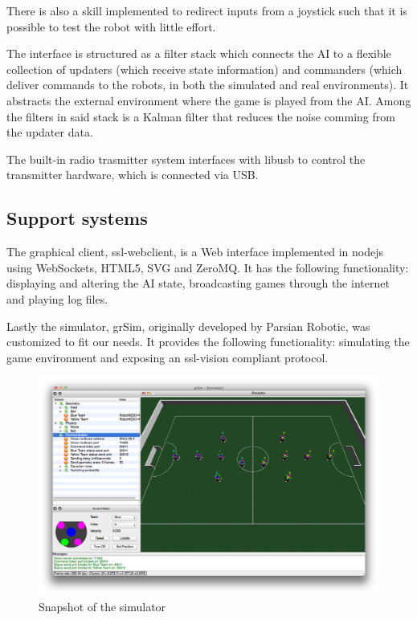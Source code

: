 There is also a skill implemented to redirect inputs from a joystick such that it is possible to test the robot with little effort.

The interface is structured as a filter stack which connects the AI to a flexible collection of updaters (which receive state information) and commanders (which deliver commands to the robots, in both the simulated and real environments).
It abstracts the external environment where the game is played from the AI.
Among the filters in said stack is a Kalman filter that reduces the noise comming from the updater data.

The built-in radio trasmitter system interfaces with libusb to control the transmitter hardware, which is connected via USB.


\subsection{Support systems}

The graphical client, ssl-webclient, is a Web interface implemented in nodejs using WebSockets, HTML5, SVG and ZeroMQ.
It has the following functionality: displaying and altering the AI state, broadcasting games through the internet and playing log files.

Lastly the simulator, grSim, originally developed by Parsian Robotic, was customized to fit our needs.
It provides the following functionality: simulating the game environment and exposing an ssl-vision compliant protocol.

\begin{figure}[H]
     \centering
     \includegraphics[width=12cm]{img/grsim.png}
     \caption{Snapshot of the simulator}
     \label{simulatorSnapshot}
\end{figure}

